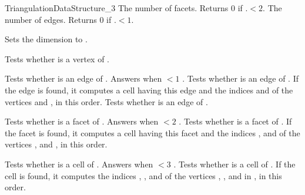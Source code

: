 \begin{ccRefConcept}{TriangulationDataStructure_3}
{The number of facets. Returns 0 if \ccVar.$<2$.}
\ccGlue
{}
{The number of edges. Returns 0 if \ccVar.$<1$.}

\begin{ccAdvanced}
{Sets the dimension to .}
\end{ccAdvanced}


{Tests whether  is a vertex of \ccVar.}

{Tests whether  is an edge of \ccVar. Answers  when
 $<1$ .
}
\ccGlue
{}
{Tests whether  is an edge of \ccVar. If the edge is found,
it computes a cell  having this edge and the indices 
and  of the vertices  and , in this order.}
\ccGlue
{}
{Tests whether  is an edge of \ccVar.}

{Tests whether  is a facet of \ccVar. Answers  when
 $<2$ .
}
\ccGlue
{}
{Tests whether  is a facet of \ccVar. If the facet is found,
it computes a cell  having this facet and the indices ,
 and  of the vertices ,  and , in
this order.} 

{Tests whether  is a cell of \ccVar. Answers  when
 $<3$ .}
{Tests whether  is a cell of \ccVar. If the cell
 is found, it computes the indices , , 
and  of the vertices , ,  and  in
, in this order.} 


\end{ccRefConcept}
